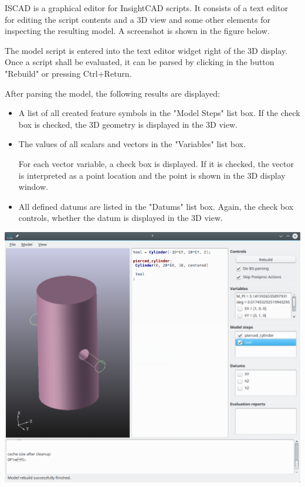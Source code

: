 ISCAD is a graphical editor for InsightCAD scripts. It
consists of a text editor for editing the script contents and a 3D view
and some other elements for inspecting the resulting model. A screenshot
is shown in the figure below.

The model script is entered into the text editor widget right of the 3D
display. Once a script shall be evaluated, it can be parsed by clicking
in the button "Rebuild" or pressing Ctrl+Return.

After parsing the model, the following results are displayed:

\begin{itemize}
\item A list of all created feature symbols in the "Model Steps" list box.
    If the check box is checked, the 3D geometry is displayed in the
    3D view.
\item The values of all scalars and vectors in the "Variables" list box.

    For each vector variable, a check box is displayed. If it is
    checked, the vector is interpreted as a point location and the point
    is shown in the 3D display window.

\item All defined datums are listed in the "Datums" list box. Again, the
    check box controls, whether the datum is displayed in the 3D view.
\end{itemize}
 

\includegraphics[width=\linewidth]{figs/iscad/screenshot_iscad}

